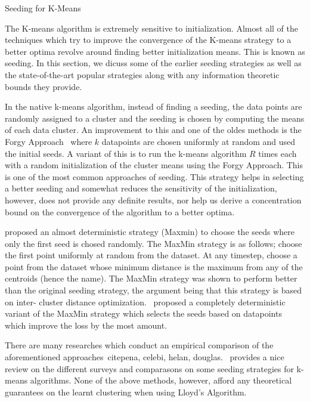 \documentclass[10pt]{article}
\begin{document}
\begin{psection}{Seeding for K-Means}

    The K-means algorithm is extremely sensitive to initialization. Almost all of the
    techniques which try to improve the convergence of the K-means strategy to a better
    optima revolve around finding better initialization means. This is known as seeding.
    In this section, we dicuss some of the earlier seeding strategies as well as the
    state-of-the-art popular strategies along with any information theoretic bounds they
    provide.

    In the native k-means algorithm, instead of finding a seeding, the data points are
    randomly assigned to a cluster and the seeding is chosen by computing the means of
    each data cluster. An improvement to this and one of the oldes methods is the
    Forgy Approach~\cite{forgy} where $k$ datapoints are chosen uniformly at random
    and used the initial seeds. A variant of this is to run the k-means algorithm $R$
    times each with a random initialization of the cluster means using the Forgy
    Approach. This is one of the most common approaches of seeding. This strategy helps
    in selecting a better seeding and somewhat reduces the sensitivity of the
    initialization, however, does not provide any definite results, nor help us derive a
    concentration bound on the convergence of the algorithm to a better optima.

    \citet{maxmin} proposed an almost deterministic strategy (Maxmin) to choose the
    seeds where only the first seed is chosed randomly. The MaxMin strategy is as
    follows; choose the first point uniformly at random from the dataset. At any
    timestep, choose a point from the dataset whose minimum distance is the maximum from
    any of the centroids (hence the name). The MaxMin strategy was shown to perform
    better than the original seeding strategy, the argument being that this strategy is
    based on inter- cluster distance optimization.~\cite{ka} proposed a completely
    deterministic variant of the MaxMin strategy which selects the seeds based on
    datapoints which improve the loss by the most amount.

    There are many researches which conduct an empirical comparison of the
    aforementioned approaches~cite{pena, celebi, helan, douglas}.~\cite{sami} provides
    a nice review on the different surveys and comparasons on some seeding strategies
    for k-means algorithms. None of the above methods, however, afford any theoretical
    guarantees on the learnt clustering when using Lloyd's Algorithm.


\end{psection}
\end{document}
